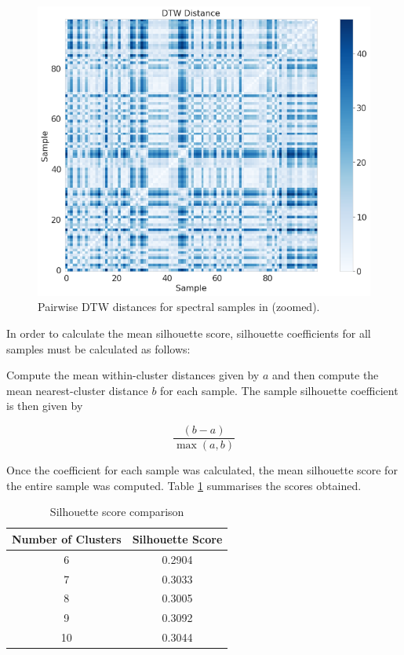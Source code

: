 \begin{figure}[!htb]
\centering
\includegraphics[scale=0.60]{figures/dtw cotar zoomed.png}
\caption{Pairwise DTW distances for spectral samples in \citet{vcotar2021galah} (zoomed).}
\end{figure}

In order to calculate the mean silhouette score, silhouette coefficients for all samples must be calculated as follows:

Compute the mean within-cluster distances given by $a$ and then compute the mean nearest-cluster distance $b$ for each sample. The sample silhouette coefficient is then given by

\begin{equation}
\frac{(b-a)}{\max_{}(a,b)}
\end{equation}

Once the coefficient for each sample was calculated, the mean silhouette score for the entire sample was computed. Table \ref{table:Silhouette Score} summarises the scores obtained.

\begin{table}[]
\begin{center}
\begin{tabular}{|c|c|}
\hline
\textbf{Number of Clusters} & \textbf{Silhouette Score} \\ \hline
6                     & 0.2904                    \\ \hline
7                     & 0.3033                    \\ \hline
8                     & 0.3005                    \\ \hline
9                     & 0.3092                    \\ \hline
10                    & 0.3044                    \\ \hline
\end{tabular}
\caption{Silhouette score comparison}
\label{table:Silhouette Score}
\end{center}
\end{table}

